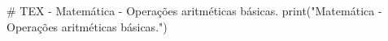 # TEX - Matemática - Operações aritméticas básicas.
print("Matemática - Operações aritméticas básicas.")
